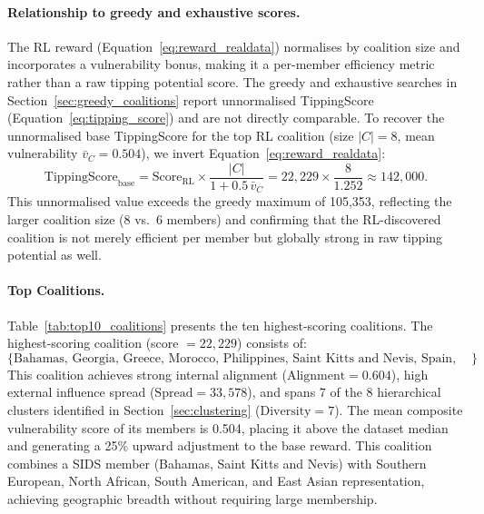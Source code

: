 \documentclass[11pt]{article}
\begin{document}
\paragraph{Relationship to greedy and exhaustive scores.}
The RL reward (Equation~\ref{eq:reward_realdata}) normalises by coalition size and incorporates a vulnerability bonus, making it a per-member efficiency metric rather than a raw tipping potential score. The greedy and exhaustive searches in Section~\ref{sec:greedy_coalitions} report unnormalised TippingScore (Equation~\ref{eq:tipping_score}) and are not directly comparable. To recover the unnormalised base TippingScore for the top RL coalition (size $|C|=8$, mean vulnerability $\bar{v}_C = 0.504$), we invert Equation~\ref{eq:reward_realdata}:
\[
    \text{TippingScore}_{\text{base}} = \text{Score}_{\text{RL}} \times \frac{|C|}{1 + 0.5\,\bar{v}_C} = 22{,}229 \times \frac{8}{1.252} \approx 142{,}000.
\]
This unnormalised value exceeds the greedy maximum of 105{,}353, reflecting the larger coalition size (8 vs.\ 6 members) and confirming that the RL-discovered coalition is not merely efficient per member but globally strong in raw tipping potential as well.

\paragraph{Top Coalitions.}
Table~\ref{tab:top10_coalitions} presents the ten highest-scoring coalitions. The highest-scoring coalition (score $= 22{,}229$) consists of:
\[
\{\text{Bahamas, Georgia, Greece, Morocco, Philippines, Saint Kitts and Nevis, Spain, Uruguay}\}
\]
This coalition achieves strong internal alignment ($\mathrm{Alignment} = 0.604$), high external influence spread ($\mathrm{Spread} = 33{,}578$), and spans 7 of the 8 hierarchical clusters identified in Section~\ref{sec:clustering} ($\mathrm{Diversity} = 7$). The mean composite vulnerability score of its members is 0.504, placing it above the dataset median and generating a 25\% upward adjustment to the base reward. This coalition combines a SIDS member (Bahamas, Saint Kitts and Nevis) with Southern European, North African, South American, and East Asian representation, achieving geographic breadth without requiring large membership.
\end{document}
